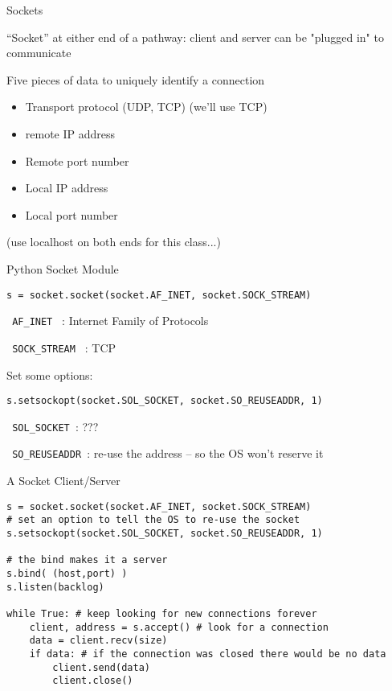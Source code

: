 \documentclass{beamer}
\begin{document}
\begin{frame}[fragile]{Sockets}

{\Large ``Socket'' at either end of a pathway: client and server can be
"plugged in" to communicate}

{\Large Five pieces of data to uniquely identify a connection}

\begin{itemize}
  \item Transport protocol (UDP, TCP) (we'll use TCP)
  \item remote IP address
  \item Remote port number
  \item Local IP address
  \item Local port number 
\end{itemize}

\vfill
(use localhost on both ends for this class...)
\end{frame} 

\begin{frame}[fragile]{Python Socket Module}

{\Large }
\begin{verbatim}
s = socket.socket(socket.AF_INET, socket.SOCK_STREAM)
\end{verbatim}
\verb| AF_INET | : Internet Family of Protocols

\verb| SOCK_STREAM | : TCP

\vfill
{\Large Set some options:}
\begin{verbatim}
s.setsockopt(socket.SOL_SOCKET, socket.SO_REUSEADDR, 1)  
\end{verbatim}
\verb| SOL_SOCKET |: ???

\verb| SO_REUSEADDR |: re-use the address -- so the OS won't reserve it

\end{frame}

\begin{frame}[fragile]{A Socket Client/Server}

\begin{verbatim}
s = socket.socket(socket.AF_INET, socket.SOCK_STREAM) 
# set an option to tell the OS to re-use the socket
s.setsockopt(socket.SOL_SOCKET, socket.SO_REUSEADDR, 1)

# the bind makes it a server
s.bind( (host,port) ) 
s.listen(backlog) 

while True: # keep looking for new connections forever
    client, address = s.accept() # look for a connection
    data = client.recv(size)
    if data: # if the connection was closed there would be no data
        client.send(data) 
        client.close()
\end{verbatim}
\end{frame}
\end{document}
